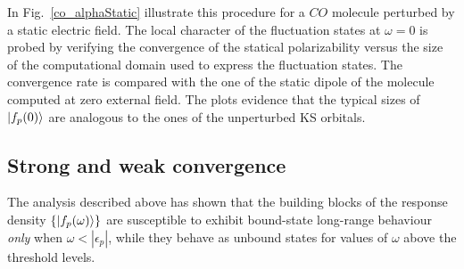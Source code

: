 \documentclass[reprint,aps,prb]{revtex4-1}
\newcommand{\eps}{\epsilon}
\newcommand{\op}[1]{\hat {#1}}
\newcommand{\dmnot}{\op{\rho}_0}
\begin{document}
In Fig.~\eqref{co_alphaStatic} illustrate this procedure for a $CO$ molecule 
perturbed by a static electric field. The local character of the fluctuation states at $\omega=0$ is 
probed by verifying the convergence of the statical polarizability versus 
the size of the computational domain used to express the fluctuation states. The convergence rate is compared with the 
one of the static dipole of the molecule computed at zero external field. 
The plots evidence that the typical sizes of $\ket{f_p(0)}$ are analogous to the ones of the unperturbed KS orbitals. 

\subsection{Strong and weak convergence}

The analysis described above has shown that the building blocks of the response density $\{\ket{f_p(\omega)}\}$ 
are susceptible to exhibit bound-state long-range behaviour \emph{only} when $\omega < |\eps_p|$, 
while they behave as unbound states for values of $\omega$ above the threshold levels.
\end{document}
